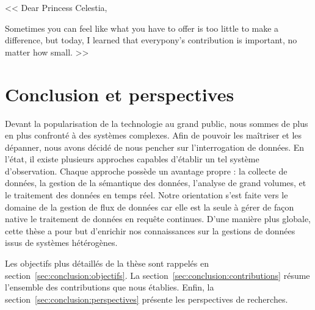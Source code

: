 \begin{savequote}[.5\textwidth]
<< Dear Princess Celestia,

\quad Sometimes you can feel like what you have to offer is too little to make a difference, but today, I learned that everypony's contribution is important, no matter how small. >>
\end{savequote}

\chapter{Conclusion et perspectives}\label{chap:conclusion}
\chaptertoc


Devant la popularisation de la technologie au grand public, nous sommes de plus en plus confronté à des systèmes complexes. Afin de pouvoir les maîtriser et les dépanner, nous avons décidé de nous pencher sur l'interrogation de données. En l'état, il existe plusieurs approches capables d'établir un tel système d'observation. Chaque approche possède un avantage propre : la collecte de données, la gestion de la sémantique des données, l'analyse de grand volumes, et le traitement des données en temps réel. Notre orientation s'est faite vers le domaine de la gestion de flux de données car elle est la seule à gérer de façon native le traitement de données en requête continues. D'une manière plus globale, cette thèse a pour but d'enrichir nos connaissances sur la gestions de données issus de systèmes hétérogènes. 

Les objectifs plus détaillés de la thèse sont rappelés en section~\ref{sec:conclusion:objectifs}. La section~\ref{sec:conclusion:contributions} résume l'ensemble des contributions que nous établies. Enfin, la section~\ref{sec:conclusion:perspectives} présente les perspectives de recherches.




